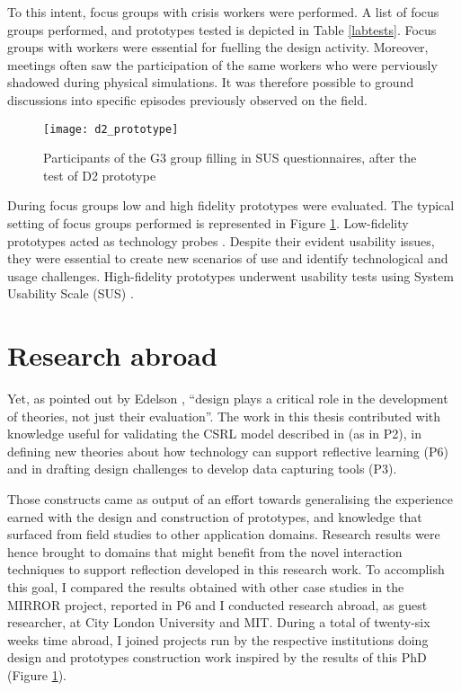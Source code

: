 To this intent, focus groups with crisis workers were performed. A list
of focus groups performed, and prototypes tested is depicted in Table
\ref{labtests}. Focus groups with workers were essential for fuelling
the design activity. Moreover, meetings often saw the participation of
the same workers who were perviously shadowed during physical
simulations. It was therefore possible to ground discussions into
specific episodes previously observed on the field.

\begin{figure}[htb]
    \centering
    \texttt{[image: d2\_prototype]}
    \caption{Participants of the G3 group filling in SUS questionnaires, after the test of D2 prototype}
    \label{fig:focus-group}
\end{figure}

During focus groups low and high fidelity prototypes were evaluated. The
typical setting of focus groups performed is represented in Figure
\ref{fig:focus-group}. Low-fidelity prototypes acted as technology
probes \autocite{Hutchinson:2003il}. Despite their evident usability
issues, they were essential to create new scenarios of use and identify
technological and usage challenges. High-fidelity prototypes underwent
usability tests \autocite{Dumas:2009th} using System Usability Scale
(SUS) \autocite[ pag.189]{jordan1996usability}.

\section{Research abroad}\label{research-abroad}

Yet, as pointed out by Edelson \autocite*{Edelson:2002kp}, ``design
plays a critical role in the development of theories, not just their
evaluation''. The work in this thesis contributed with knowledge useful
for validating the CSRL model described in \autocite{Krogstie:fo} (as in
P2), in defining new theories about how technology can support
reflective learning (P6) and in drafting design challenges to develop
data capturing tools (P3).

Those constructs came as output of an effort towards generalising the
experience earned with the design and construction of prototypes, and
knowledge that surfaced from field studies to other application domains.
Research results were hence brought to domains that might benefit from
the novel interaction techniques to support reflection developed in this
research work. To accomplish this goal, I compared the results obtained
with other case studies in the MIRROR project, reported in P6 and I
conducted research abroad, as guest researcher, at City London
University and MIT. During a total of twenty-six weeks time abroad, I
joined projects run by the respective institutions doing design and
prototypes construction work inspired by the results of this PhD (Figure
\ref{research-abroad}).

